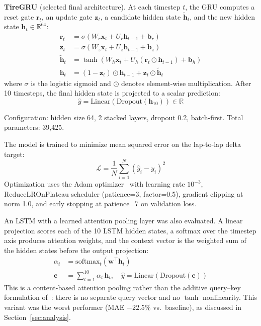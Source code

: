 \textbf{TireGRU} (selected final architecture). At each timestep $t$, the GRU computes a reset gate $\mathbf{r}_t$, an update gate $\mathbf{z}_t$, a candidate hidden state $\tilde{\mathbf{h}}_t$, and the new hidden state $\mathbf{h}_t \in \mathbb{R}^{64}$:
\begin{align}
\mathbf{r}_t &= \sigma(W_r \mathbf{x}_t + U_r \mathbf{h}_{t-1} + \mathbf{b}_r) \\
\mathbf{z}_t &= \sigma(W_z \mathbf{x}_t + U_z \mathbf{h}_{t-1} + \mathbf{b}_z) \\
\tilde{\mathbf{h}}_t &= \tanh\!\left(W_h \mathbf{x}_t + U_h(\mathbf{r}_t \odot \mathbf{h}_{t-1}) + \mathbf{b}_h\right) \\
\mathbf{h}_t &= (1 - \mathbf{z}_t) \odot \mathbf{h}_{t-1} + \mathbf{z}_t \odot \tilde{\mathbf{h}}_t
\end{align}
where $\sigma$ is the logistic sigmoid and $\odot$ denotes element-wise multiplication. After 10 timesteps, the final hidden state is projected to a scalar prediction:
\begin{equation}
\hat{y} = \text{Linear}(\text{Dropout}(\mathbf{h}_{10})) \in \mathbb{R}
\end{equation}

\noindent Configuration: hidden size 64, 2 stacked layers, dropout 0.2, batch-first. Total parameters: 39{,}425.

The model is trained to minimize mean squared error on the lap-to-lap delta target:
\begin{equation}
\mathcal{L} = \frac{1}{N}\sum_{i=1}^{N}(\hat{y}_i - y_i)^2
\end{equation}
Optimization uses the Adam optimizer~\cite{kingma2015} with learning rate $10^{-3}$, ReduceLROnPlateau scheduler (patience=3, factor=0.5), gradient clipping at norm 1.0, and early stopping at patience=7 on validation loss.

An LSTM with a learned attention pooling layer was also evaluated. A linear projection scores each of the 10 LSTM hidden states, a softmax over the timestep axis produces attention weights, and the context vector is the weighted sum of the hidden states before the output projection:
\begin{align}
\alpha_t &= \mathrm{softmax}_t(\mathbf{w}^\top \mathbf{h}_t) \\
\mathbf{c} &= \sum_{t=1}^{10} \alpha_t\, \mathbf{h}_t, \quad \hat{y} = \text{Linear}(\text{Dropout}(\mathbf{c}))
\end{align}
This is a content-based attention pooling rather than the additive query--key formulation of~\cite{bahdanau2015}: there is no separate query vector and no $\tanh$ nonlinearity. This variant was the worst performer (MAE $-22.5\%$ vs.\ baseline), as discussed in Section~\ref{sec:analysis}.

